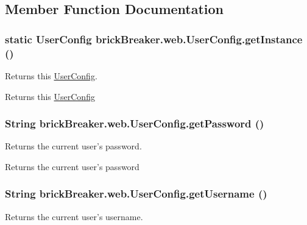 \subsection{Member Function Documentation}
\hypertarget{classbrick_breaker_1_1web_1_1_user_config_a1d3a26745df81ea9335d7c1945400445}{
\subsubsection[{getInstance}]{\setlength{\rightskip}{0pt plus 5cm}static {\bf UserConfig} brickBreaker.web.UserConfig.getInstance ()}}
\label{classbrick_breaker_1_1web_1_1_user_config_a1d3a26745df81ea9335d7c1945400445}
Returns this {\ttfamily \hyperlink{classbrick_breaker_1_1web_1_1_user_config}{UserConfig}}.

\begin{DoxyReturn}{Returns}
this {\ttfamily \hyperlink{classbrick_breaker_1_1web_1_1_user_config}{UserConfig}} 
\end{DoxyReturn}
\hypertarget{classbrick_breaker_1_1web_1_1_user_config_a06f536ee2fc04b8d49d42d0e110ff1dc}{
\subsubsection[{getPassword}]{\setlength{\rightskip}{0pt plus 5cm}String brickBreaker.web.UserConfig.getPassword ()}}
\label{classbrick_breaker_1_1web_1_1_user_config_a06f536ee2fc04b8d49d42d0e110ff1dc}
Returns the current user's password.

\begin{DoxyReturn}{Returns}
the current user's password 
\end{DoxyReturn}
\hypertarget{classbrick_breaker_1_1web_1_1_user_config_a058016814e1d4b5b15c1708ed96e5acf}{
\subsubsection[{getUsername}]{\setlength{\rightskip}{0pt plus 5cm}String brickBreaker.web.UserConfig.getUsername ()}}
\label{classbrick_breaker_1_1web_1_1_user_config_a058016814e1d4b5b15c1708ed96e5acf}
Returns the current user's username.

